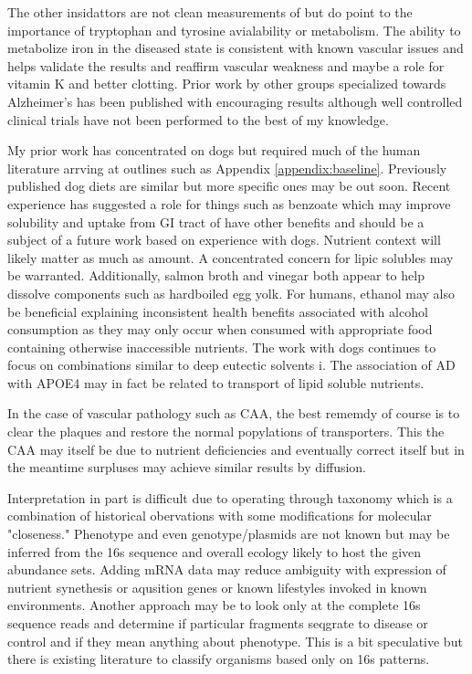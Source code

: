 \documentclass[aps,secnumarabic,balancelastpage,amsmath,amssymb,nofootinbib]{revtex4}
\newcommand{\mjmrefapp}[1]{Appendix   \ref{appendix:#1}}
\begin{document}
The other insidattors
are not clean measurements of but do point to the
importance of tryptophan and tyrosine avialability
or metabolism. The ability to metabolize iron in the
diseased state is consistent with known vascular issues
and helps validate the results and reaffirm vascular
weakness and maybe a role for vitamin K and better
clotting. 
Prior work by other groups specialized towards
Alzheimer's has been published with encouraging
results although well controlled clinical trials
have not been performed to the best of my knowledge.





My prior work has concentrated on dogs but
required much of the human literature arrving at
 outlines such as  \mjmrefapp{baseline}.
Previously published dog diets are similar
\cite{marchywka-MJM-2022-013-0.10}
\cite{mmarchywka-MJM-2021-003-v0.50rg}
but more specific ones may be out soon.
Recent experience has suggested a role for things such as
benzoate which may improve solubility and uptake
from GI tract of have other benefits\cite{marchywka-MJM-2022-013-0.10}
 and should be
a subject of a future work based on experience with dogs. Nutrient context
will likely matter as much as amount. A concentrated
concern for lipic solubles
may be warranted. 
Additionally, salmon broth and vinegar both appear
to help dissolve components such as hardboiled egg yolk.
For humans, ethanol may also be beneficial explaining
inconsistent health benefits associated with alcohol
consumption as they may only occur when consumed with
appropriate food containing otherwise inaccessible nutrients.
The work with dogs continues to focus on combinations
similar to deep eutectic solvents i\cite{marchywka-MJM-2021-018-0.50rg}.
The association of AD with APOE4
may in fact be related to transport of lipid soluble
nutrients. 

In the case of vascular pathology such as CAA, the best rememdy of
course is to clear the plaques and restore the normal
popylations of transporters. This the CAA may itself be due to
nutrient deficiencies and eventually correct itself
but in the meantime surpluses may achieve similar
results by diffusion. 


Interpretation in part is difficult due to operating through
taxonomy which is a combination of historical obervations 
with some modifications for molecular "closeness."  Phenotype
and even genotype/plasmids  are not known but may be inferred from the
16s sequence and overall ecology likely to host the given
abundance sets. Adding mRNA data  may reduce ambiguity with
expression of nutrient synethesis or aqusition genes or known
lifestyles invoked in known environments. Another approach
may be to look only at the complete 16s sequence reads and
determine if particular fragments seqgrate to disease or
control and if they mean anything about phenotype. 
This is a bit speculative but there is existing literature to
classify organisms based only on 16s patterns.  
\end{document}
